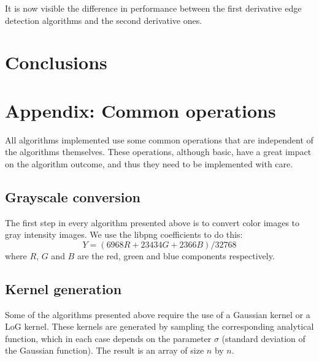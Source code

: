 \documentclass{ipol}
\numberwithin{equation}{section}
\numberwithin{table}{section}
\numberwithin{figure}{section}
\begin{document}
It is now visible the difference in performance between the first derivative edge detection algorithms and the second derivative ones. \\

\clearpage
\section{Conclusions}
\label{sec:conclusions}


\clearpage
\section{Appendix: Common operations}
\label{sec:appendix1}

All algorithms implemented use some common operations that are independent of the algorithms themselves. 
These operations, although basic, have a great impact on the algorithm outcome, and thus they need to be 
implemented with care.\\

\subsection{Grayscale conversion}

The first step in every algorithm presented above is to convert color images to gray intensity images. 
We use the libpng coefficients to do this:
\begin{equation}
    Y = (6968 R + 23434 G + 2366 B) / 32768
\end{equation}
where $R$, $G$ and $B$ are the red, green and blue components respectively.\\

\subsection{Kernel generation}
\label{sec:appendix2}

Some of the algorithms presented above require the use of a Gaussian kernel or a LoG kernel. These 
kernels are generated by sampling the corresponding analytical function, which in each case depends 
on the parameter $\sigma$ (standard deviation of the Gaussian function). The result is an array of 
size $n$ by $n$.\\
\end{document}
